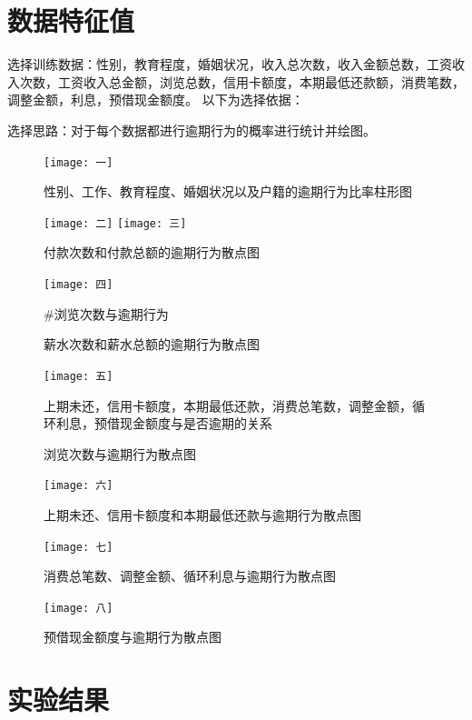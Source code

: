 \documentclass{article}
\begin{document}
\section{数据特征值}
选择训练数据：性别，教育程度，婚姻状况，收入总次数，收入金额总数，工资收入次数，工资收入总金额，浏览总数，信用卡额度，本期最低还款额，消费笔数，调整金额，利息，预借现金额度。
以下为选择依据：

选择思路：对于每个数据都进行逾期行为的概率进行统计并绘图。
\begin{figure}[h] 
\centering 
\texttt{[image: 一]}
\caption{性别、工作、教育程度、婚姻状况以及户籍的逾期行为比率柱形图}


\end{figure}

\begin{figure}[h]
\centering 
\texttt{[image: 二]}
\texttt{[image: 三]}
\caption{付款次数和付款总额的逾期行为散点图}
\end{figure}

\begin{figure}[h]
\texttt{[image: 四]}
\caption{薪水次数和薪水总额的逾期行为散点图}
\#浏览次数与逾期行为
\end{figure}


\begin{figure}[h]
\centering 
\texttt{[image: 五]}
\caption{浏览次数与逾期行为散点图}
上期未还，信用卡额度，本期最低还款，消费总笔数，调整金额，循环利息，预借现金额度与是否逾期的关系
\end{figure}

\begin{figure}[h]
\texttt{[image: 六]}
\caption{上期未还、信用卡额度和本期最低还款与逾期行为散点图}
\end{figure}

\begin{figure}[h]
\texttt{[image: 七]}
\caption{消费总笔数、调整金额、循环利息与逾期行为散点图}
\end{figure}

\begin{figure}[h]
\centering
\texttt{[image: 八]}
\caption{预借现金额度与逾期行为散点图}
\end{figure}

\section{实验结果}
\end{document}
